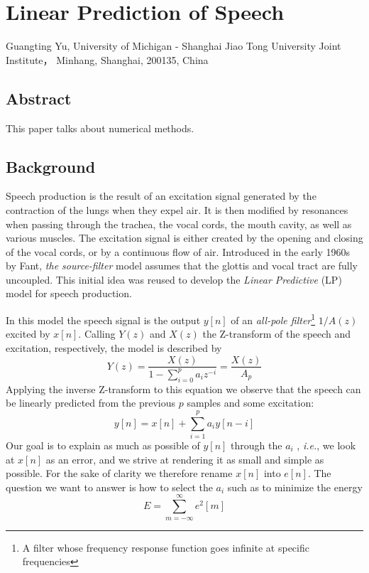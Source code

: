 \titleformat{\section}{\normalfont\large\bfseries}{\thesection}{1em}{}
\renewcommand{\chaptername}{Project}
\renewcommand{\thesection}{\arabic{section}}




\chapter{Linear Prediction of Speech}
\begin{center}
Guangting Yu, University of Michigan - Shanghai Jiao Tong University Joint Institute， Minhang, Shanghai, 200135, China
\end{center}


\section*{Abstract}
This paper talks about numerical methods.



\section{Background}
Speech production is the result of an excitation signal generated by the contraction of the lungs when they expel air.\cite{dutoit}
It is then modified by resonances when passing through the trachea, the vocal cords, the mouth cavity, as well as various muscles.\cite{tam59}
The excitation signal is either created by the opening and closing of the vocal cords, or by a continuous flow of air.\cite{gtm181}
Introduced in the early 1960s by Fant, \textit{the source-filter} model assumes that the glottis and vocal tract are fully uncoupled.\cite{corless}
This initial idea was reused to develop the \textit{Linear Predictive} (LP) model for speech production.\cite{tam39}

In this model the speech signal is the output \(y[n]\) of an \textit{all-pole filter}\footnote{A filter whose frequency response function goes infinite at specific frequencies} \(1/A(z)\) excited by \(x[n]\).\cite{golan}
Calling \(Y(z)\) and \(X(z)\) the Z-transform of the speech and excitation, respectively, the model is described by\cite{utm}
\[ Y(z)=\frac{X(z)}{1-\sum_{i=0}^p a_i z^{-i}}=\frac{X(z)}{A_p} \]
Applying the inverse Z-transform to this equation we observe that the speech can be linearly predicted from the previous $p$ samples and some excitation:
\[ y[n] = x[n]+\sum_{i=1}^p a_i y[n-i] \]
Our goal is to explain as much as possible of \(y[n]\) through the $a_i$ , \textit{i.e.}, we look at \(x[n]\) as an error, and we strive at rendering it as small and simple as possible.\cite{gtm135}
For the sake of clarity we therefore rename \(x[n]\) into \(e[n]\).\cite{cc12}
The question we want to answer is how to select the $a_i$ such as to minimize the energy
\[ E=\sum_{m=-\infty}^\infty e^2[m] \]

